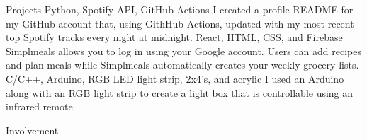 \documentclass[]{resume}
\begin{document}
\begin{topic}{Projects}
    {Python, Spotify API, GitHub Actions}
    {
        I created a profile README for my GitHub account that, using GithHub Actions, updated with my most recent top Spotify tracks every night at midnight.
    }
    {React, HTML, CSS, and Firebase}
    {
        Simplmeals allows you to log in using your Google account. Users can add recipes and plan meals while Simplmeals automatically creates your weekly grocery lists.
    }
    {C/C++, Arduino, RGB LED light strip, 2x4’s, and acrylic}
    {
        I used an Arduino along with an RGB light strip to create a light box that is controllable using an infrared remote.
    }\\
\end{topic}

\begin{topic}{Involvement}
\end{topic}
\end{document}
